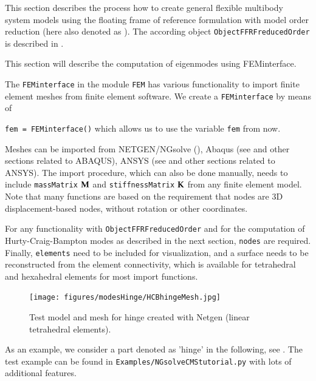 \newpage
{}
\label{sec:theory:CMS}

This section describes the process how to create general flexible multibody system models using the floating frame of reference formulation with model order reduction (here also denoted as ). The according object \texttt{ObjectFFRFreducedOrder} is described in .

This section will describe the computation of eigenmodes using FEMinterface.

The \texttt{FEMinterface} in the module \texttt{FEM} has various functionality to import finite element meshes from finite element software.
We create a \texttt{FEMinterface} by means of
\bi
  \item[] \texttt{fem = FEMinterface()}
\ei
which allows us to use the variable \texttt{fem} from now.

Meshes can be imported from NETGEN/NGsolve (), Abaqus (see  and other sections related to ABAQUS), ANSYS (see  and other sections related to ANSYS).
The import procedure, which can also be done manually, needs to include \texttt{massMatrix} $\mathbf{M}$ and \texttt{stiffnessMatrix} $\mathbf{K}$ from any finite element model.
Note that many functions are based on the requirement that nodes are 3D displacement-based nodes, without rotation or other coordinates.

For any functionality with \texttt{ObjectFFRFreducedOrder} and for the computation of Hurty-Craig-Bampton modes as described in the next section, \texttt{nodes}
are required.
Finally, \texttt{elements} need to be included for visualization, and a surface needs to be reconstructed from the element connectivity, which is available for tetrahedral and hexahedral elements for most import functions.

\begin{figure}[tbph]
  \begin{center}
  \texttt{[image: figures/modesHinge/HCBhingeMesh.jpg]}
  \end{center}
  \caption{Test model and mesh for hinge created with Netgen (linear tetrahedral elements).}
	\label{fig_hingePartMesh}
\end{figure}
As an example, we consider a part denoted as 'hinge' in the following, see . The test example can be found in \texttt{Examples/NGsolveCMStutorial.py} with lots of additional features.

